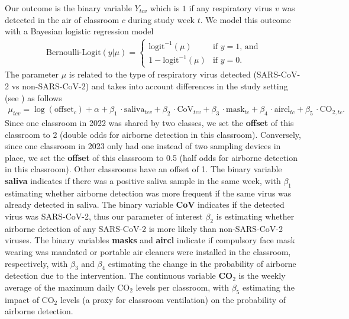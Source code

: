 \documentclass[fleqn,11pt]{wlscirep_supp}
\begin{document}
Our outcome is the binary variable $Y_{tcv}$ which is $1$ if any respiratory virus $v$ was detected in the air of classroom $c$ during study week $t$. We model this outcome with a Bayesian logistic regression model
\begin{align}
    \text{Bernoulli-Logit}(y|\mu) = \begin{cases}
        \text{logit}^{-1}(\mu) & \text{if }y=1\text{, and} \\
        1-\text{logit}^{-1}(\mu) & \text{if }y=0.
    \end{cases}
\end{align}
The parameter $\mu$ is related to the type of respiratory virus detected (SARS-CoV-2 vs non-SARS-CoV-2) and takes into account differences in the study setting (see ) as follows
\begin{align}
    \mu_{tcv} = \log(\text{offset}_c) + \alpha + \beta_1\,\cdot\text{saliva}_{tcv} + \beta_2\,\cdot\text{CoV}_{tcv} + \beta_3\,\cdot\text{mask}_{tc} + \beta_4\,\cdot\text{aircl}_{tc} + \beta_5\,\cdot\text{CO}_{2,tc}.
\end{align}
Since one classroom in 2022 was shared by two classes, we set the \textbf{offset} of this classroom to 2 (double odds for airborne detection in this classroom). Conversely, since one classroom in 2023 only had one instead of two sampling devices in place, we set the \textbf{offset} of this classroom to 0.5 (half odds for airborne detection in this classroom). Other classrooms have an offset of 1. The binary variable \textbf{saliva} indicates if there was a positive saliva sample in the same week, with $\beta_1$ estimating whether airborne detection was more frequent if the same virus was already detected in saliva. The binary variable \textbf{CoV} indicates if the detected virus was SARS-CoV-2, thus our parameter of interest $\beta_2$ is estimating whether airborne detection of any SARS-CoV-2 is more likely than non-SARS-CoV-2 viruses. The binary variables \textbf{masks} and \textbf{aircl} indicate if compulsory face mask wearing was mandated or portable air cleaners were installed in the classroom, respectively, with $\beta_3$ and $\beta_4$ estimating the change in the probability of airborne detection due to the intervention. The continuous variable \textbf{CO}$_2$ is the weekly average of the maximum daily CO$_2$ levels per classroom, with $\beta_5$ estimating the impact of CO$_2$ levels (a proxy for classroom ventilation) on the probability of airborne detection.
\end{document}
